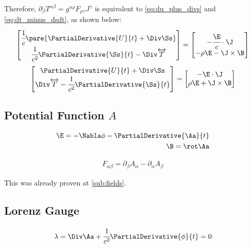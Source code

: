   Therefore, $\partial_\beta T^{\alpha\beta} = g^{\alpha\rho}F_{\rho\gamma}J^\gamma$ is equivalent to \autoref{eq:du_plus_divs} and \autoref{eq:dt_minus_dsdt}, as shown below:
  \begin{align}
    \begin{bmatrix}
      \cfrac{1}{c} \pare{\PartialDerivative{U}{t} + \Div \Ss} \\
      \cfrac{1}{c^2}\PartialDerivative{\Ss}{t} - \Div \overleftrightarrow{T}
    \end{bmatrix}
    = \begin{bmatrix}
      -\cfrac{\E}{c}\cdot \J \\
      - \rho\E - \J\times\B
  \end{bmatrix}
  \end{align}
  \begin{align}
    \begin{bmatrix}
      \PartialDerivative{U}{t} + \Div \Ss \\
      \Div \overleftrightarrow{T} - \cfrac{1}{c^2}\PartialDerivative{\Ss}{t}
    \end{bmatrix}
    = \begin{bmatrix}
      -\E\cdot \J \\
      \rho\E + \J\times\B
  \end{bmatrix}
  \end{align}

\subsection{Potential Function $A$}

  \begin{align}
    \E = -\Nabla \phi - \PartialDerivative{\Aa}{t}\\
    \B = \rot \Aa
  \end{align}

  \begin{align}
    F_{\alpha\beta} = \partial_\beta A_\alpha - \partial_\alpha A_\beta
  \end{align}

  This was already proven at \autoref{sub:fields}.

\subsection{Lorenz Gauge}

  \begin{align}
    \lambda = \Div \Aa + \cfrac{1}{c^2}\PartialDerivative{\phi}{t} = 0
  \end{align}

